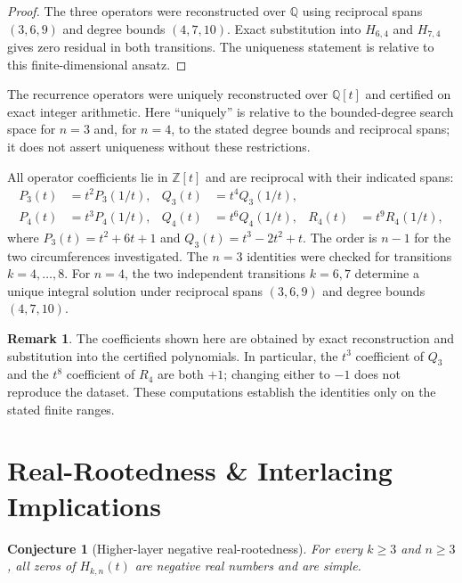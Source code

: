 \documentclass[11pt,a4paper]{article}
\newtheorem{conjecture}[theorem]{Conjecture}
\theoremstyle{definition}
\newtheorem{remark}[theorem]{Remark}
\begin{document}
\begin{proof}
The three operators were reconstructed over $\mathbb{Q}$ using reciprocal
spans $(3,6,9)$ and degree bounds $(4,7,10)$. Exact substitution into
$H_{6,4}$ and $H_{7,4}$ gives zero residual in both transitions. The
uniqueness statement is relative to this finite-dimensional ansatz.
\end{proof}

The recurrence operators were uniquely reconstructed over
$\mathbb{Q}[t]$ and certified on exact integer arithmetic. Here
``uniquely'' is relative to the bounded-degree search space for $n=3$
and, for $n=4$, to the stated degree bounds and reciprocal spans; it does
not assert uniqueness without these restrictions.

All operator coefficients lie in $\mathbb{Z}[t]$ and are reciprocal with
their indicated spans:
\[
\begin{aligned}
P_3(t)&=t^2P_3(1/t),&
Q_3(t)&=t^4Q_3(1/t),\\
P_4(t)&=t^3P_4(1/t),&
Q_4(t)&=t^6Q_4(1/t),&
R_4(t)&=t^9R_4(1/t),
\end{aligned}
\]
where $P_3(t)=t^2+6t+1$ and $Q_3(t)=t^3-2t^2+t$. The order is $n-1$
for the two circumferences investigated. The $n=3$ identities were
checked for transitions $k=4,\ldots,8$. For $n=4$, the two independent
transitions $k=6,7$ determine a unique integral solution under reciprocal
spans $(3,6,9)$ and degree bounds $(4,7,10)$.

\begin{remark}
The coefficients shown here are obtained by exact reconstruction and
substitution into the certified polynomials. In particular, the
$t^3$ coefficient of $Q_3$ and the $t^8$ coefficient of $R_4$ are both
$+1$; changing either to $-1$ does not reproduce the dataset. These
computations establish the identities only on the stated finite ranges.
\end{remark}

\section{Real-Rootedness \& Interlacing Implications}
\label{sec:root-implications}

\begin{conjecture}[Higher-layer negative real-rootedness]
\label{conj:realrooted}
For every $k\ge3$ and $n\ge3$, all zeros of $H_{k,n}(t)$ are negative
real numbers and are simple.
\end{conjecture}
\end{document}
